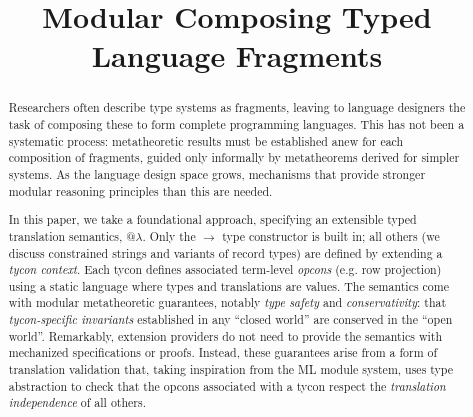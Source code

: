 \documentclass[pldi]{sigplanconf-pldi15}
\begin{document}
\conferenceinfo{-}{-} 
\copyrightyear{-} 
\copyrightdata{[to be supplied]} 


\title{Modular Composing Typed Language Fragments}

\authorinfo{}{}{}

\maketitle
\begin{abstract}
Researchers often describe type systems as fragments, leaving to language designers the task of composing these to form complete programming  languages. 
This has not been a systematic process: metatheoretic results must be established anew for each composition of fragments, guided only informally by metatheorems derived for simpler systems.
As the language design space grows, mechanisms that provide stronger modular reasoning principles than this are needed.

In this paper, we take a foundational approach, specifying an extensible typed translation semantics, @$\lambda$. Only the $\rightarrow$ type constructor is built in; all others (we discuss constrained strings and variants of record types) are defined by extending a \emph{tycon context}. Each tycon defines associated term-level \emph{opcons} (e.g. row projection) using a static language where types and translations are values. The semantics come with modular metatheoretic guarantees, notably \emph{type safety} and \emph{conservativity}: that \emph{tycon-specific  invariants} established in any ``closed world'' are conserved in the ``open world''. Remarkably, extension providers do not need to  provide the semantics with mechanized specifications or proofs. Instead, these guarantees arise from a form of translation validation that, taking inspiration from the ML module system, uses type abstraction to check that the opcons associated with a tycon respect the \emph{translation independence} of all others.
\end{abstract}

\end{document}
